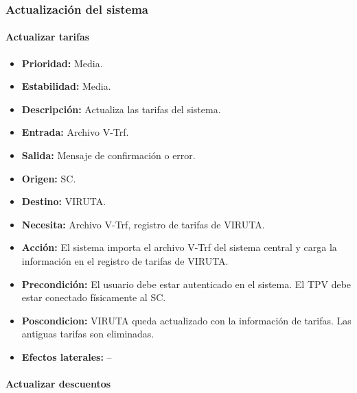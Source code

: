 \subsubsection{Actualización del sistema}

\paragraph{Actualizar tarifas}

\begin{itemize}
\item \textbf{Prioridad:} Media.
\item \textbf{Estabilidad:} Media.
\item \textbf{Descripción:} Actualiza las tarifas del sistema.
\item \textbf{Entrada:} Archivo V-Trf.
\item \textbf{Salida:} Mensaje de confirmación o error.
\item \textbf{Origen:} SC.
\item \textbf{Destino:} VIRUTA.
\item \textbf{Necesita:} Archivo V-Trf, registro de tarifas de VIRUTA.
\item \textbf{Acción:} El sistema importa el archivo V-Trf del sistema central y carga la información en el registro de tarifas de VIRUTA.
\item \textbf{Precondición:} El usuario debe estar autenticado en el sistema. El TPV debe estar conectado físicamente al SC.
\item \textbf{Poscondicion:} VIRUTA queda actualizado con la información de tarifas. Las antiguas tarifas son eliminadas.
\item \textbf{Efectos laterales:} --
\end{itemize}

\paragraph{Actualizar descuentos}

